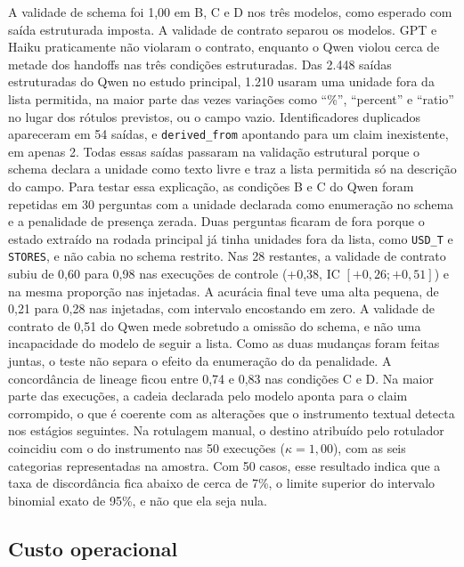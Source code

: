 A validade de schema foi 1,00 em B, C e D nos três modelos, como esperado com saída estruturada imposta.
A validade de contrato separou os modelos.
GPT e Haiku praticamente não violaram o contrato, enquanto o Qwen violou cerca de metade dos handoffs nas três condições estruturadas.
Das 2.448 saídas estruturadas do Qwen no estudo principal, 1.210 usaram uma unidade fora da lista permitida, na maior parte das vezes variações como ``\%'', ``percent'' e ``ratio'' no lugar dos rótulos previstos, ou o campo vazio.
Identificadores duplicados apareceram em 54 saídas, e \texttt{derived\_from} apontando para um claim inexistente, em apenas 2.
Todas essas saídas passaram na validação estrutural porque o schema declara a unidade como texto livre e traz a lista permitida só na descrição do campo.
Para testar essa explicação, as condições B e C do Qwen foram repetidas em 30 perguntas com a unidade declarada como enumeração no schema e a penalidade de presença zerada. Duas perguntas ficaram de fora porque o estado extraído na rodada principal já tinha unidades fora da lista, como \texttt{USD\_T} e \texttt{STORES}, e não cabia no schema restrito.
Nas 28 restantes, a validade de contrato subiu de 0,60 para 0,98 nas execuções de controle (+0,38, IC $[+0{,}26; +0{,}51]$) e na mesma proporção nas injetadas. A acurácia final teve uma alta pequena, de 0,21 para 0,28 nas injetadas, com intervalo encostando em zero.
A validade de contrato de 0,51 do Qwen mede sobretudo a omissão do schema, e não uma incapacidade do modelo de seguir a lista. Como as duas mudanças foram feitas juntas, o teste não separa o efeito da enumeração do da penalidade.
A concordância de lineage ficou entre 0,74 e 0,83 nas condições C e D. Na maior parte das execuções, a cadeia declarada pelo modelo aponta para o claim corrompido, o que é coerente com as alterações que o instrumento textual detecta nos estágios seguintes.
Na rotulagem manual, o destino atribuído pelo rotulador coincidiu com o do instrumento nas 50 execuções ($\kappa = 1{,}00$), com as seis categorias representadas na amostra. Com 50 casos, esse resultado indica que a taxa de discordância fica abaixo de cerca de 7\%, o limite superior do intervalo binomial exato de 95\%, e não que ela seja nula.

\subsection{Custo operacional}\label{sec:custo}

